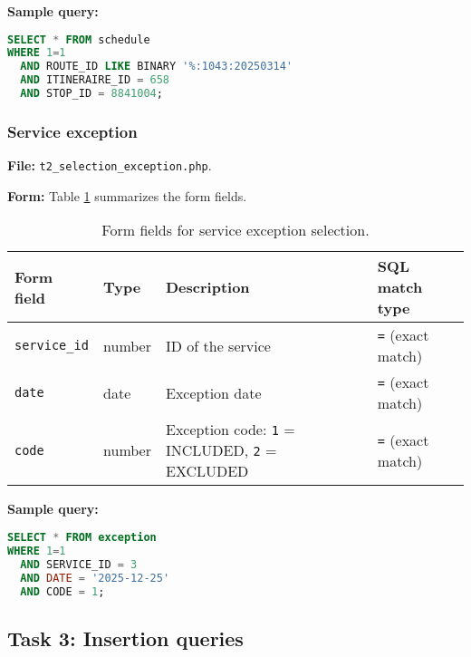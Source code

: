 \documentclass[a4paper, 12pt]{article}
\begin{document}
\textbf{Sample query:}

\begin{lstlisting}[language=SQL]
SELECT * FROM schedule
WHERE 1=1
  AND ROUTE_ID LIKE BINARY '%:1043:20250314'
  AND ITINERAIRE_ID = 658
  AND STOP_ID = 8841004;
\end{lstlisting}


\subsubsection{Service exception}

\textbf{File:} \texttt{t2\_selection\_exception.php}.

\textbf{Form:} Table \ref{tab:p3-t2-exception-form-fields} summarizes the form fields.

\begin{table}[H]
    \centering
    \footnotesize
    \caption{Form fields for service exception selection.}
    \label{tab:p3-t2-exception-form-fields}
    \begin{tabular}{llll}
        \toprule
        \textbf{Form field} & \textbf{Type} & \textbf{Description} & \textbf{SQL match type} \\
        \midrule
        \texttt{service\_id} & number & ID of the service                                           & \texttt{=} (exact match) \\
        \texttt{date}        & date   & Exception date                                              & \texttt{=} (exact match) \\
        \texttt{code}        & number & Exception code: \texttt{1} = INCLUDED, \texttt{2} = EXCLUDED & \texttt{=} (exact match) \\
        \bottomrule
    \end{tabular}
\end{table}

\textbf{Sample query:}

\begin{lstlisting}[language=SQL]
SELECT * FROM exception
WHERE 1=1
  AND SERVICE_ID = 3
  AND DATE = '2025-12-25'
  AND CODE = 1;
\end{lstlisting}


% 
\newpage
\subsection{Task 3: Insertion queries}
\end{document}
